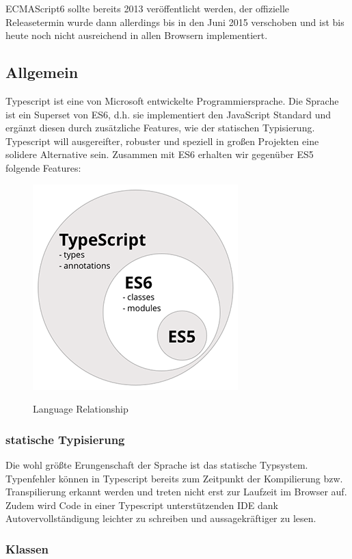 ECMAScript6 sollte bereits 2013 veröffentlicht werden, der offizielle Releasetermin wurde
dann allerdings bis in den Juni 2015 verschoben und ist bis heute noch nicht ausreichend in allen Browsern implementiert.
\cite{js-vs-es}

\subsection{Allgemein}

Typescript ist eine von Microsoft entwickelte Programmiersprache.
Die Sprache ist ein Superset von ES6, d.h. sie implementiert den JavaScript Standard und ergänzt diesen
durch zusätzliche Features, wie der statischen Typisierung.
Typescript will ausgereifter, robuster und speziell in großen Projekten eine solidere Alternative sein. \cite[28]{EssentialTS}
Zusammen mit ES6 erhalten wir gegenüber ES5 folgende Features:

\begin{figure}[ht]
 \centering
 \includegraphics[width=0.4\linewidth]{kapitel2/typescript----es5-es6-typescript-circle-diagram.png}
 \caption{Language Relationship}\cite[152]{ng-Book-2}
\end{figure}


\subsubsection{statische Typisierung}

Die wohl größte Erungenschaft der Sprache ist das statische Typsystem.
Typenfehler können in Typescript bereits zum Zeitpunkt
der Kompilierung bzw. Transpilierung erkannt werden und treten nicht erst zur Laufzeit im Browser auf.
Zudem wird Code in einer Typescript unterstützenden IDE dank Autovervollständigung
leichter zu schreiben und aussagekräftiger zu lesen.\cite[156]{ng-Book-2}

\subsubsection{Klassen}

